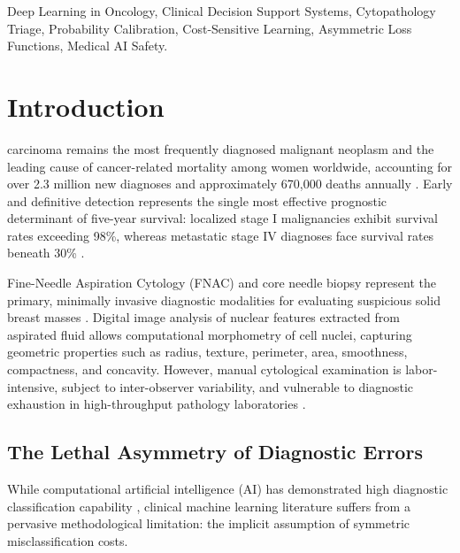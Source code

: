 \documentclass[journal,compsoc]{IEEEtran}
\begin{document}
\begin{IEEEkeywords}
Deep Learning in Oncology, Clinical Decision Support Systems, Cytopathology Triage, Probability Calibration, Cost-Sensitive Learning, Asymmetric Loss Functions, Medical AI Safety.
\end{IEEEkeywords}

\section{Introduction}

 carcinoma remains the most frequently diagnosed malignant neoplasm and the leading cause of cancer-related mortality among women worldwide, accounting for over 2.3 million new diagnoses and approximately 670,000 deaths annually \cite{sung2021global}. Early and definitive detection represents the single most effective prognostic determinant of five-year survival: localized stage I malignancies exhibit survival rates exceeding 98\%, whereas metastatic stage IV diagnoses face survival rates beneath 30\% \cite{siegel2023cancer}.

Fine-Needle Aspiration Cytology (FNAC) and core needle biopsy represent the primary, minimally invasive diagnostic modalities for evaluating suspicious solid breast masses \cite{street1993nuclear, wolberg1995image}. Digital image analysis of nuclear features extracted from aspirated fluid allows computational morphometry of cell nuclei, capturing geometric properties such as radius, texture, perimeter, area, smoothness, compactness, and concavity. However, manual cytological examination is labor-intensive, subject to inter-observer variability, and vulnerable to diagnostic exhaustion in high-throughput pathology laboratories \cite{elmore2015diagnostic}.

\subsection{The Lethal Asymmetry of Diagnostic Errors}
While computational artificial intelligence (AI) has demonstrated high diagnostic classification capability \cite{esteva2017dermatologist, mckinney2020international}, clinical machine learning literature suffers from a pervasive methodological limitation: the implicit assumption of symmetric misclassification costs.
\end{document}
